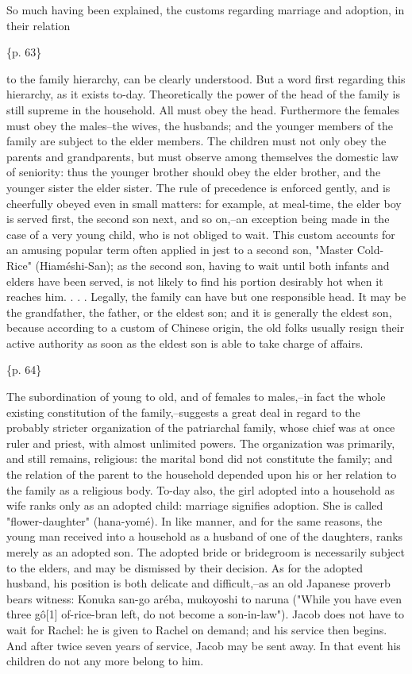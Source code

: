 So much having been explained, the customs regarding marriage and adoption, in their relation

\{p. 63\}

to the family hierarchy, can be clearly understood. But a word first regarding this hierarchy, as it exists to-day. Theoretically the power of the head of the family is still supreme in the household. All must obey the head. Furthermore the females must obey the males--the wives, the husbands; and the younger members of the family are subject to the elder members. The children must not only obey the parents and grandparents, but must observe among themselves the domestic law of seniority: thus the younger brother should obey the elder brother, and the younger sister the elder sister. The rule of precedence is enforced gently, and is cheerfully obeyed even in small matters: for example, at meal-time, the elder boy is served first, the second son next, and so on,--an exception being made in the case of a very young child, who is not obliged to wait. This custom accounts for an amusing popular term often applied in jest to a second son, "Master Cold-Rice" (Hiaméshi-San); as the second son, having to wait until both infants and elders have been served, is not likely to find his portion desirably hot when it reaches him. . . . Legally, the family can have but one responsible head. It may be the grandfather, the father, or the eldest son; and it is generally the eldest son, because according to a custom of Chinese origin, the old folks usually resign their active authority as soon as the eldest son is able to take charge of affairs.

\{p. 64\}

The subordination of young to old, and of females to males,--in fact the whole existing constitution of the family,--suggests a great deal in regard to the probably stricter organization of the patriarchal family, whose chief was at once ruler and priest, with almost unlimited powers. The organization was primarily, and still remains, religious: the marital bond did not constitute the family; and the relation of the parent to the household depended upon his or her relation to the family as a religious body. To-day also, the girl adopted into a household as wife ranks only as an adopted child: marriage signifies adoption. She is called "flower-daughter" (hana-yomé). In like manner, and for the same reasons, the young man received into a household as a husband of one of the daughters, ranks merely as an adopted son. The adopted bride or bridegroom is necessarily subject to the elders, and may be dismissed by their decision. As for the adopted husband, his position is both delicate and difficult,--as an old Japanese proverb bears witness: Konuka san-go aréba, mukoyoshi to naruna ("While you have even three gô[1] of-rice-bran left, do not become a son-in-law"). Jacob does not have to wait for Rachel: he is given to Rachel on demand; and his service then begins. And after twice seven years of service, Jacob may be sent away. In that event his children do not any more belong to him.

